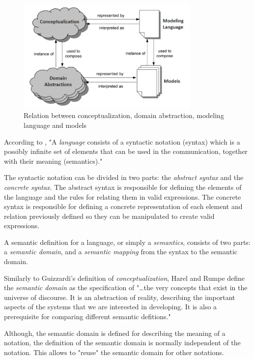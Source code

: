 \documentclass[
	10pt,				%
	oneside,
	a4paper,			%
	brazil,
	english
	]{abntex2}
\begin{document}
\begin{figure}[here]
\includegraphics[width=0.8\textwidth]{images/materializing_concepts}
\caption{Relation between conceptualization, domain abstraction, modeling language and
models}
\label{fig:materializing_concepts}
\end{figure}

According to ,
"A \emph{language} consists of a syntactic notation (syntax) which is a possibly
infinite set of elements that can be used in the communication, together with
their meaning (semantics)."

The syntactic notation can be divided in two parts: the \emph{abstract syntax}
and the \emph{concrete syntax}.
%
The abstract syntax is responsible for defining the elements of the language and
the rules for relating them in valid expressions.
%
The concrete syntax is responsible for defining a concrete representation of each
element and relation previously defined so they can be manipulated to create valid
expressions. \cite{harel_rumpe00}

A semantic definition for a language, or simply a \emph{semantics}, consists of
two parts: a \emph{semantic domain}, and a \emph{semantic mapping} from the syntax
to the semantic domain.

Similarly to Guizzardi's definition of \emph{conceptualization}, Harel and Rumpe
define the \emph{semantic domain} as the specification of "\ldots the very concepts
that exist in the universe of discourse. It is an abstraction of reality, describing
the important aspects of the systems that we are interested in developing. It is
also a prerequisite for comparing different semantic defitions."

Although, the semantic domain is defined for describing the meaning of a notation,
the definition of the semantic domain is normally independent of the notation.
This allows to "reuse" the semantic domain for other notations. \cite{harel_rumpe00}
\end{document}
